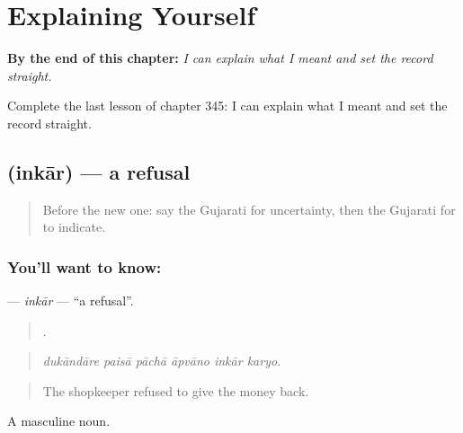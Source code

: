 
\chapter{Explaining Yourself}
\label{ch:gu-explaining-yourself}

\begin{chapteropening}
\textbf{By the end of this chapter:} \emph{I can explain what I meant and set the record straight.}

Complete the last lesson of chapter 345: I can explain what I meant and set the record straight.
\end{chapteropening}

\section[\texorpdfstring{\gu{ઇનકાર} (inkār)}{ઇનકાર (inkār)}]{ (inkār) — a refusal}

\label{lesson:GU-C345-inkar}



\begin{quote}
Before the new one: say the Gujarati for uncertainty, then the Gujarati for to indicate.
\end{quote}

\subsection*{You'll want to know: }
\textbf{} — \emph{inkār} — \textquotedblleft{}a refusal\textquotedblright{}.

\begin{quote}
     .
\end{quote}

\begin{quote}
\emph{dukāndāre paisā pāchā āpvāno inkār karyo.}
\end{quote}

\begin{quote}
The shopkeeper refused to give the money back.
\end{quote}

A masculine noun.

